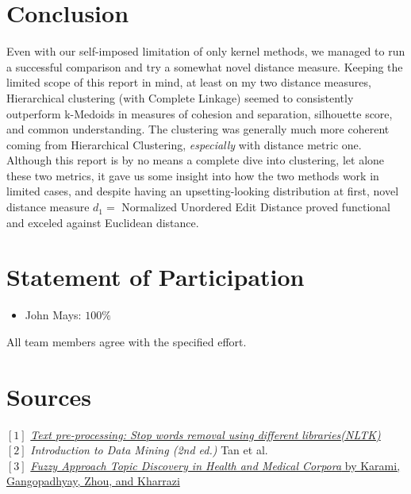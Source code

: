 \documentclass[fleqn]{article}
\begin{document}
\section{Conclusion}
Even with our self-imposed limitation of only kernel methods, we managed to run a successful comparison and try a somewhat novel distance measure.  Keeping the limited scope of this report in mind, at least on my two distance measures, Hierarchical clustering (with Complete Linkage) seemed to consistently outperform k-Medoids in measures of cohesion and separation, silhouette score, and common understanding.  The clustering was generally much more coherent coming from Hierarchical Clustering, \textit{especially} with distance metric one.  Although this report is by no means a complete dive into clustering, let alone these two metrics, it gave us some insight into how the two methods work in limited cases, and despite having an upsetting-looking distribution at first, novel distance measure $d_1=$ Normalized Unordered Edit Distance proved functional and exceled against Euclidean distance.


\section*{Statement of Participation}
\begin{itemize}
    \item John Mays: $100\%$
\end{itemize}
All team members agree with the specified effort.

\section*{Sources}
$[1]$ \href{https://towardsdatascience.com/text-pre-processing-stop-words-removal-using-different-libraries-f20bac19929a}{\textit{Text pre-processing: Stop words removal using different libraries(NLTK)}}\\
$[2]$ \textit{Introduction to Data Mining (2nd ed.)} Tan et al.\\
$[3]$ \href{https://arxiv.org/abs/1705.00995}{\textit{Fuzzy Approach Topic Discovery in Health and Medical Corpora} by Karami, Gangopadhyay, Zhou, and Kharrazi}
\pagebreak
\end{document}
